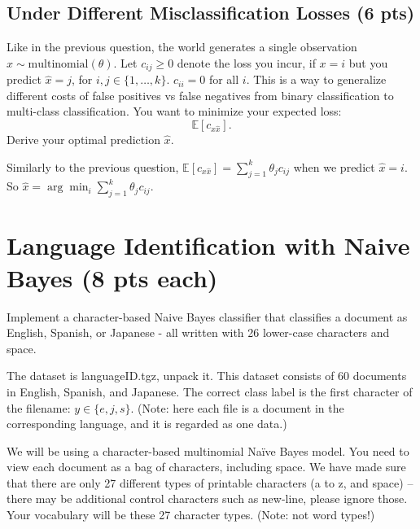 \documentclass[a4paper]{article}
\theoremstyle{definition}
\def\E{\mathbb E}
\newenvironment{soln}{
    \leavevmode\color{blue}\ignorespaces
}{}
\begin{document}
\subsection{Under Different Misclassification Losses (6 pts)}
Like in the previous question, the world generates a single observation $x \sim \mbox{multinomial}(\theta)$. Let $c_{ij} \ge 0$ denote the loss you incur, if $x=i$ but you predict $\hat x=j$, for $i,j \in \{1, \ldots, k\}$.
$c_{ii}=0$ for all $i$. This is a way to generalize different costs of false positives vs false negatives from binary classification to multi-class classification. You want to minimize your expected loss:
$$\E[c_{x \hat x}].$$
Derive your optimal prediction $\hat x$.

\begin{soln}
    Similarly to the previous question, $\E[c_{x \hat x}] = \sum_{j = 1}^{k} \theta_{j} c_{ij}$ when we predict $\hat x = i$.
    So $\hat x = \arg \min_{i} \sum_{j = 1}^{k} \theta_{j} c_{ij}$. 
\end{soln}

\section{Language Identification with Naive Bayes (8 pts each)}
Implement a character-based Naive Bayes classifier that classifies a document as English, Spanish, or Japanese - all written with 26 lower-case characters and space.

The dataset is languageID.tgz, unpack it. This dataset consists of 60 documents in English, Spanish, and Japanese. The correct class label is the first character of the filename: $y \in \{e, j, s\}$. (Note: here each file is a document in the corresponding language, and it is regarded as one data.)

We will be using a character-based multinomial Naïve Bayes model. You need to view each document as a bag of characters, including space. We have made sure that there are only 27 different types of printable characters (a to z, and space) -- there may be additional control characters such as new-line, please ignore those. Your vocabulary will be these 27 character types. (Note: not word types!)
\end{document}
